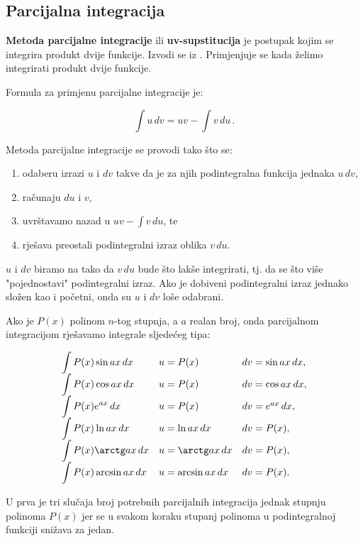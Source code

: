 \subsection{Parcijalna integracija}

\textbf{Metoda parcijalne integracije} ili \textbf{uv-supstitucija} je postupak
kojim se integrira produkt dvije funkcije. Izvodi se iz . Primjenjuje se kada želimo
integrirati produkt dvije funkcije.


Formula za primjenu parcijalne integracije je:

$$
\int u\,dv = uv - \int v\,du\,.
$$

Metoda parcijalne integracije se provodi tako što se:
\begin{enumerate}
    \item odaberu izrazi $u$ i $dv$ takve da je za njih podintegralna funkcija
    jednaka $u\,dv$,
    \item računaju $du$ i $v$,
    \item uvrštavamo nazad u $\displaystyle uv - \int v\,du$, te
    \item rješava preostali podintegralni izraz oblika $v\,du$.
\end{enumerate}

$u$ i $dv$ biramo na tako da $v\,du$ bude što lakše integrirati, tj. da se što
više "pojednostavi" podintegralni izraz. Ako je dobiveni podintegralni izraz
jednako složen kao i početni, onda su $u$ i $dv$ loše odabrani.

Ako je $P(x)$ polinom $n$-tog stupnja, a $a$ realan broj, onda parcijalnom
integracijom rješavamo integrale sljedećeg tipa:

$$
\begin{array}{lll}
    \displaystyle \int P(x)\sin ax\,dx & u=P(x) & dv=\sin ax\,dx,\\
    \displaystyle \int P(x)\cos ax\,dx & u=P(x) & dv=\cos ax\,dx,\\
    \displaystyle \int P(x)e^{ax}\,dx & u=P(x) & dv=e^{ax}\,dx,\\
    \displaystyle \int P(x)\ln ax\,dx & u=\ln ax\,dx & dv=P(x),\\
    \displaystyle \int P(x)\arctg ax\,dx & u=\arctg ax\,dx & dv=P(x),\\
    \displaystyle \int P(x)\arcsin ax\,dx & u=\arcsin ax\,dx & dv=P(x).
\end{array}
$$

U prva je tri slučaja broj potrebnih parcijalnih integracija jednak stupnju
polinoma $P(x)$ jer se u svakom koraku stupanj polinoma u podintegralnoj
funkciji snižava za jedan.

